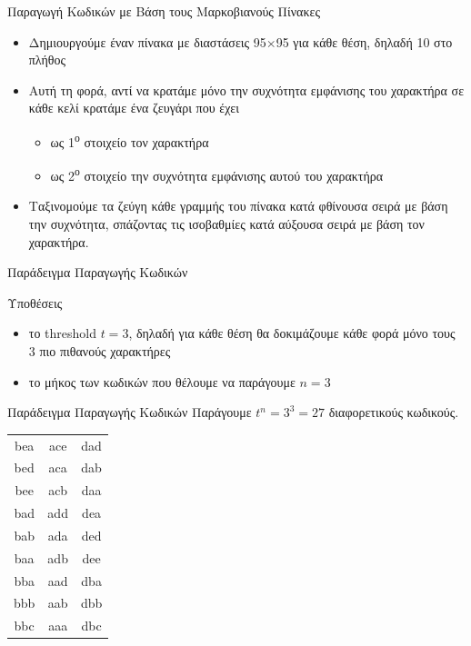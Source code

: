 \documentclass[10pt]{beamer}
\begin{document}
\begin{frame}{Παραγωγή Κωδικών με Βάση τους Μαρκοβιανούς Πίνακες}

    \begin{itemize}
        \item Δημιουργούμε έναν πίνακα με διαστάσεις 95$\times$95 για κάθε θέση, δηλαδή 10 στο πλήθος
        \item Αυτή τη φορά, αντί να κρατάμε μόνο την συχνότητα εμφάνισης του χαρακτήρα σε κάθε κελί κρατάμε ένα ζευγάρι που έχει
        \begin{itemize}
            \item ως 1\textsuperscript{ο} στοιχείο τον χαρακτήρα
            \item ως 2\textsuperscript{ο} στοιχείο την συχνότητα εμφάνισης αυτού του χαρακτήρα
        \end{itemize}
        \item Ταξινομούμε τα ζεύγη κάθε γραμμής του πίνακα κατά φθίνουσα σειρά με βάση την συχνότητα, σπάζοντας τις ισοβαθμίες κατά αύξουσα σειρά με βάση τον χαρακτήρα.
    \end{itemize}
\end{frame}



\begin{frame}{Παράδειγμα Παραγωγής Κωδικών}
    \begin{block}{Υποθέσεις}
        \begin{itemize}
            \item το threshold $t=3$, δηλαδή για κάθε θέση θα δοκιμάζουμε κάθε φορά μόνο τους 3 πιο πιθανούς χαρακτήρες
            \item το μήκος των κωδικών που θέλουμε να παράγουμε $n=3$
        \end{itemize}
    \end{block}
\end{frame}

\begin{frame}{Παράδειγμα Παραγωγής Κωδικών}
    Παράγουμε $t^n=3^3=27$ διαφορετικούς κωδικούς.
    \begin{table}[h]
        \begin{tabular}{ccc}
            bea & ace & dad \\
            bed & aca & dab \\
            bee & acb & daa \\[1em]
            bad & add & dea \\
            bab & ada & ded \\
            baa & adb & dee \\[1em]
            bba & aad & dba \\
            bbb & aab & dbb \\
            bbc & aaa & dbc \\
        \end{tabular}
    \end{table}
\end{frame}
\end{document}
